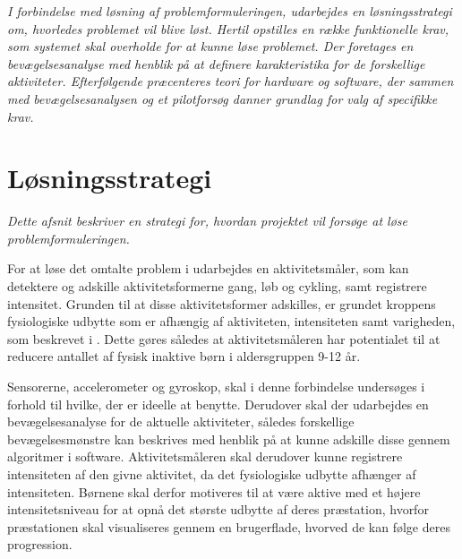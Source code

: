 \textit{I forbindelse med løsning af problemformuleringen, udarbejdes en løsningsstrategi om, hvorledes problemet vil blive løst. Hertil opstilles en række funktionelle krav, som systemet skal overholde for at kunne løse problemet. Der foretages en bevægelsesanalyse med henblik på at definere karakteristika for de forskellige aktiviteter. Efterfølgende præcenteres teori for hardware og software, der sammen med bevægelsesanalysen og et pilotforsøg danner grundlag for valg af specifikke krav.}

\section{Løsningsstrategi}
\textit{Dette afsnit beskriver en strategi for, hvordan projektet vil forsøge at løse problemformuleringen.}

For at løse det omtalte problem i  udarbejdes en aktivitetsmåler, som kan detektere og adskille aktivitetsformerne gang, løb og cykling, samt registrere intensitet. Grunden til at disse aktivitetsformer adskilles, er grundet kroppens fysiologiske udbytte som er afhængig af aktiviteten, intensiteten samt varigheden, som beskrevet i . Dette gøres således at aktivitetsmåleren har potentialet til at reducere antallet af fysisk inaktive børn i aldersgruppen 9-12 år.

Sensorerne, accelerometer og gyroskop, skal i denne forbindelse undersøges i forhold til hvilke, der er ideelle at benytte. Derudover skal der udarbejdes en bevægelsesanalyse for de aktuelle aktiviteter, således forskellige bevægelsesmønstre kan beskrives med henblik på at kunne adskille disse gennem algoritmer i software. Aktivitetsmåleren skal derudover kunne registrere intensiteten af den givne aktivitet, da det fysiologiske udbytte afhænger af intensiteten. Børnene skal derfor motiveres til at være aktive med et højere intensitetsniveau for at opnå det største udbytte af deres præstation, hvorfor præstationen skal visualiseres gennem en brugerflade, hvorved de kan følge deres progression.





